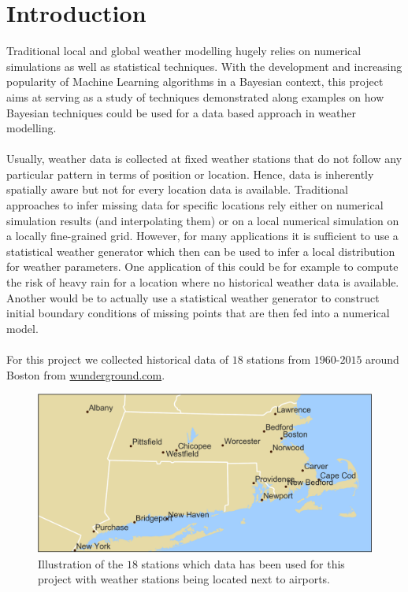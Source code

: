 \documentclass{article}
\begin{document}
\doublespacing
\section{Introduction}
Traditional local and global weather modelling hugely relies on numerical simulations as well as statistical techniques. With the development and increasing popularity of Machine Learning algorithms in a Bayesian context, this project aims at serving as a study of techniques demonstrated along examples on how Bayesian techniques could be used for a data based approach in weather modelling.
\\
\\
Usually, weather data is collected at fixed weather stations that do not follow any particular pattern in terms of position or location. Hence, data is inherently spatially aware but not for every location data is available. Traditional approaches to infer missing data for specific locations rely either on numerical simulation results (and interpolating them) or on a local numerical simulation on a locally fine-grained grid. However, for many applications it is sufficient to use a statistical weather generator\cite{stochwg} which then can be used to infer a local distribution for weather parameters. One application of this could be for example to compute the risk of heavy rain for a location where no historical weather data is available. Another would be to actually use a statistical weather generator to construct initial boundary conditions of missing points that are then fed into a numerical model.
\\
\\
For this project we collected historical data of $18$ stations from $1960$-$2015$ around Boston from \url{wunderground.com}. 
\begin{figure}
\centering
\includegraphics[scale=0.5]{../images/top_stations.png}
\caption{Illustration of the $18$ stations which data has been used for this project with weather stations being located next to airports.}
\end{figure}
\end{document}
